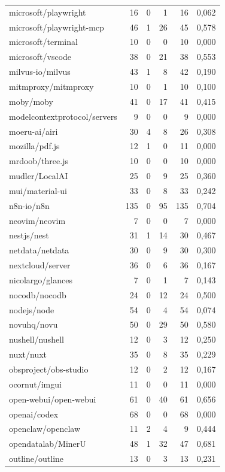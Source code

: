 \begin{tabular}{lrrrrr}
microsoft/playwright & 16 & 0 & 1 & 16 & 0,062 \\
microsoft/playwright-mcp & 46 & 1 & 26 & 45 & 0,578 \\
microsoft/terminal & 10 & 0 & 0 & 10 & 0,000 \\
microsoft/vscode & 38 & 0 & 21 & 38 & 0,553 \\
milvus-io/milvus & 43 & 1 & 8 & 42 & 0,190 \\
mitmproxy/mitmproxy & 10 & 0 & 1 & 10 & 0,100 \\
moby/moby & 41 & 0 & 17 & 41 & 0,415 \\
modelcontextprotocol/servers & 9 & 0 & 0 & 9 & 0,000 \\
moeru-ai/airi & 30 & 4 & 8 & 26 & 0,308 \\
mozilla/pdf.js & 12 & 1 & 0 & 11 & 0,000 \\
mrdoob/three.js & 10 & 0 & 0 & 10 & 0,000 \\
mudler/LocalAI & 25 & 0 & 9 & 25 & 0,360 \\
mui/material-ui & 33 & 0 & 8 & 33 & 0,242 \\
n8n-io/n8n & 135 & 0 & 95 & 135 & 0,704 \\
neovim/neovim & 7 & 0 & 0 & 7 & 0,000 \\
nestjs/nest & 31 & 1 & 14 & 30 & 0,467 \\
netdata/netdata & 30 & 0 & 9 & 30 & 0,300 \\
nextcloud/server & 36 & 0 & 6 & 36 & 0,167 \\
nicolargo/glances & 7 & 0 & 1 & 7 & 0,143 \\
nocodb/nocodb & 24 & 0 & 12 & 24 & 0,500 \\
nodejs/node & 54 & 0 & 4 & 54 & 0,074 \\
novuhq/novu & 50 & 0 & 29 & 50 & 0,580 \\
nushell/nushell & 12 & 0 & 3 & 12 & 0,250 \\
nuxt/nuxt & 35 & 0 & 8 & 35 & 0,229 \\
obsproject/obs-studio & 12 & 0 & 2 & 12 & 0,167 \\
ocornut/imgui & 11 & 0 & 0 & 11 & 0,000 \\
open-webui/open-webui & 61 & 0 & 40 & 61 & 0,656 \\
openai/codex & 68 & 0 & 0 & 68 & 0,000 \\
openclaw/openclaw & 11 & 2 & 4 & 9 & 0,444 \\
opendatalab/MinerU & 48 & 1 & 32 & 47 & 0,681 \\
outline/outline & 13 & 0 & 3 & 13 & 0,231 \\

\end{tabular}
